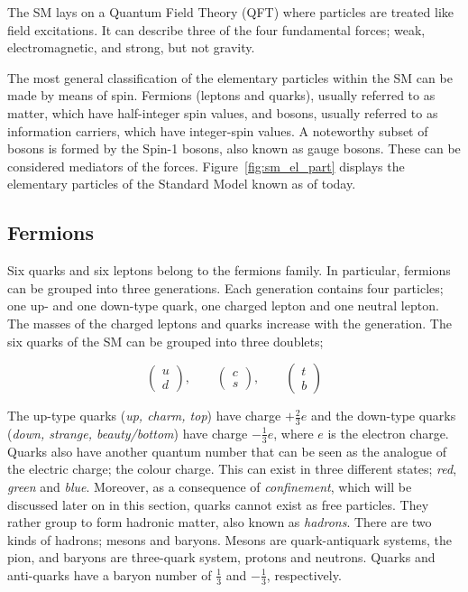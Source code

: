 		The SM lays on a Quantum Field Theory (QFT) where particles are treated like field excitations. It can describe three of the four fundamental forces; weak, electromagnetic, and strong, but not gravity.

		The most general classification of the elementary particles within the SM can be made by means of spin. Fermions (leptons and quarks), usually referred to as matter, which have half-integer spin values, and bosons, usually referred to as information carriers, which have integer-spin values. A noteworthy subset of bosons is formed by the Spin-1 bosons, also known as gauge bosons. These can be considered mediators of the forces. Figure~\ref{fig:sm_el_part} displays the elementary particles of the Standard Model known as of today.



		\subsection*{Fermions}

			Six quarks and six leptons belong to the fermions family. In particular, fermions can be grouped into three generations. Each generation contains four particles; one up- and one down-type quark, one charged lepton and one neutral lepton. The masses of the charged leptons and quarks increase with the generation. The six quarks of the SM can be grouped into three doublets;

			\begin{equation*}
			\label{eq:quark_doublets}
				\begin{pmatrix} u \\ d \end{pmatrix}, \qquad 
				\begin{pmatrix} c \\ s \end{pmatrix}, \qquad 
				\begin{pmatrix} t \\ b \end{pmatrix}
			\end{equation*}

			\noindent The up-type quarks (\textit{up, charm, top}) have charge $+\frac{2}{3}e$ and the down-type quarks (\textit{down, strange, beauty/bottom}) have charge $-\frac{1}{3}e$, where $e$ is the electron charge. Quarks also have another quantum number that can be seen as the analogue of the electric charge; the colour charge. This can exist in three different states; \textit{red}, \textit{green} and \textit{blue}. Moreover, as a consequence of \emph{confinement}, which will be discussed later on in this section, quarks cannot exist as free particles. They rather group to form hadronic matter, also known as \emph{hadrons}. There are two kinds of hadrons; mesons and baryons. Mesons are quark-antiquark systems, \eg the pion, and baryons are three-quark system, \eg protons and neutrons. Quarks and anti-quarks have a baryon number of $\frac{1}{3}$ and $-\frac{1}{3}$, respectively.

